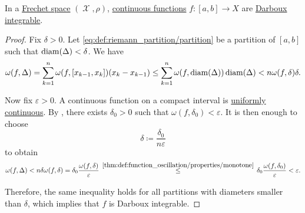 \begin{proposition}\label{thm:countinuous_functions_integrable}
  In a \hyperref[def:frechet_space]{Frechet space} \( (\mscrX, \rho) \), \hyperref[def:global_continuity]{continuous functions} \( f: [a, b] \to X \) are \hyperref[def:darboux_integrability]{Darboux integrable}.
\end{proposition}
\begin{proof}
  Fix \( \delta > 0 \). Let \eqref{eq:def:riemann_partition/partition} be a partition of \( [a, b] \) such that \( \operatorname{diam}(\Delta) < \delta \). We have
  \begin{equation*}
    \omega(f, \Delta)
    =
    \sum_{k=1}^n \omega(f, [x_{k-1}, x_k]) (x_k - x_{k-1})
    \leq
    \sum_{k=1}^n \omega(f, \operatorname{diam}(\Delta)) \operatorname{diam}(\Delta)
    <
    n \omega(f, \delta) \delta.
  \end{equation*}

  Now fix \( \varepsilon > 0 \). A continuous function on a compact interval is \hyperref[def:uniform_continuity]{uniformly continuous}. By , there exists \( \delta_0 > 0 \) such that \( \omega(f, \delta_0) < \varepsilon \). It is then enough to choose
  \begin{equation*}
    \delta \coloneqq \frac {\delta_0} {n \varepsilon}
  \end{equation*}
  to obtain
  \begin{equation*}
    \omega(f, \Delta)
    <
    n \delta \omega(f, \delta)
    =
    \delta_0 \frac {\omega(f, \delta)} {\varepsilon}
    \reloset {\ref{thm:def:function_oscillation/properties/monotone}} \leq
    \delta_0 \frac {\omega(f, \delta_0)} {\varepsilon}
    <
    \varepsilon.
  \end{equation*}

  Therefore, the same inequality holds for all partitions with diameters smaller than \( \delta \), which implies that \( f \) is Darboux integrable.
\end{proof}

